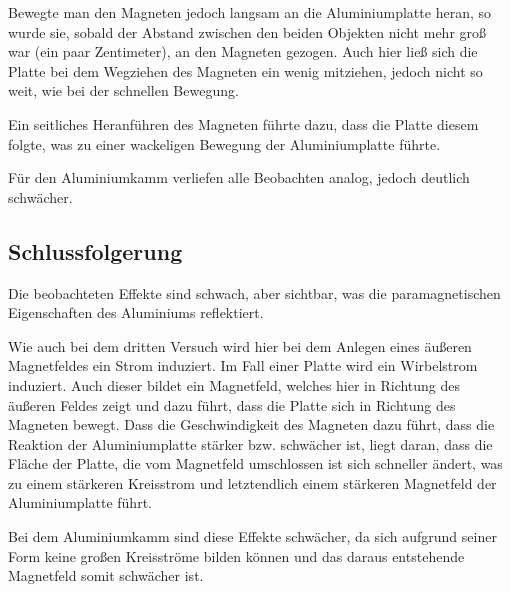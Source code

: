 \documentclass[11pt,a4paper,titlepage, ngerman]{article}
\begin{document}
			Bewegte man den Magneten jedoch langsam an die Aluminiumplatte heran, so wurde sie, sobald der Abstand zwischen den beiden Objekten nicht mehr groß war (ein paar Zentimeter), an den Magneten gezogen. 
			Auch hier ließ sich die Platte bei dem Wegziehen des Magneten ein wenig mitziehen, jedoch nicht so weit, wie bei der schnellen Bewegung.
			
			Ein seitliches Heranführen des Magneten führte dazu, dass die Platte diesem folgte, was zu einer wackeligen Bewegung der Aluminiumplatte führte.
			
			Für den Aluminiumkamm verliefen alle Beobachten analog, jedoch deutlich schwächer.
			
		\subsection*{Schlussfolgerung}	
			
			Die beobachteten Effekte sind schwach, aber sichtbar, was die paramagnetischen Eigenschaften des Aluminiums reflektiert.
			 
			Wie auch bei dem dritten Versuch wird hier bei dem Anlegen eines äußeren Magnetfeldes ein Strom induziert.
			Im Fall einer Platte wird ein Wirbelstrom induziert. Auch dieser bildet ein Magnetfeld, welches hier in Richtung des äußeren Feldes zeigt und dazu führt, dass die Platte sich in Richtung des Magneten bewegt.
			Dass die Geschwindigkeit des Magneten dazu führt, dass die Reaktion der Aluminiumplatte stärker bzw. schwächer ist, liegt daran, dass die Fläche der Platte, die vom Magnetfeld umschlossen ist sich schneller ändert, was zu einem stärkeren Kreisstrom und letztendlich einem stärkeren Magnetfeld der Aluminiumplatte führt.
			
			Bei dem Aluminiumkamm sind diese Effekte schwächer, da sich aufgrund seiner Form keine großen Kreisströme bilden können und das daraus entstehende Magnetfeld somit schwächer ist. 
		
\end{document}
